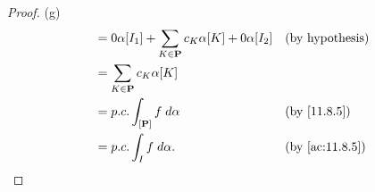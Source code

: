 \begin{proof}{(g)}
\begin{align*}
                              & = 0 \alpha[I_1] + \sum_{K \in \mathbf{P}} c_K \alpha[K] + 0 \alpha[I_2]             &  & \text{(by hypothesis)}       \\
                              & = \sum_{K \in \mathbf{P}} c_K \alpha[K]                                                                               \\
                              & = p.c. \int_{[\mathbf{P}]} f \; d \alpha                                            &  & \text{(by \cref{11.8.5})}    \\
                              & = p.c. \int_I f \; d \alpha.                                                        &  & \text{(by \cref{ac:11.8.5})}
  \end{align*}
\end{proof}

